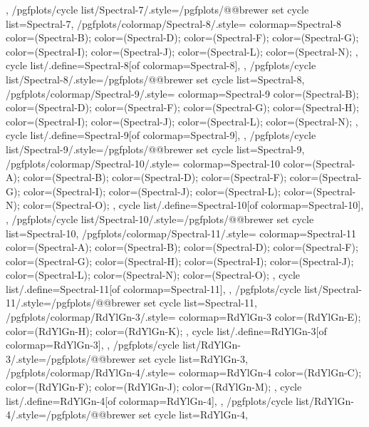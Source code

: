 {{  },
  /pgfplots/cycle list/Spectral-7/.style={/pgfplots/@@brewer set cycle list={Spectral-7}},
  /pgfplots/colormap/Spectral-8/.style={
    colormap={Spectral-8}{
      color=(Spectral-B);
      color=(Spectral-D);
      color=(Spectral-F);
      color=(Spectral-G);
      color=(Spectral-I);
      color=(Spectral-J);
      color=(Spectral-L);
      color=(Spectral-N);
    },
    cycle list/.define={Spectral-8}{[of colormap=Spectral-8]},
  },
  /pgfplots/cycle list/Spectral-8/.style={/pgfplots/@@brewer set cycle list={Spectral-8}},
  /pgfplots/colormap/Spectral-9/.style={
    colormap={Spectral-9}{
      color=(Spectral-B);
      color=(Spectral-D);
      color=(Spectral-F);
      color=(Spectral-G);
      color=(Spectral-H);
      color=(Spectral-I);
      color=(Spectral-J);
      color=(Spectral-L);
      color=(Spectral-N);
    },
    cycle list/.define={Spectral-9}{[of colormap=Spectral-9]},
  },
  /pgfplots/cycle list/Spectral-9/.style={/pgfplots/@@brewer set cycle list={Spectral-9}},
  /pgfplots/colormap/Spectral-10/.style={
    colormap={Spectral-10}{
      color=(Spectral-A);
      color=(Spectral-B);
      color=(Spectral-D);
      color=(Spectral-F);
      color=(Spectral-G);
      color=(Spectral-I);
      color=(Spectral-J);
      color=(Spectral-L);
      color=(Spectral-N);
      color=(Spectral-O);
    },
    cycle list/.define={Spectral-10}{[of colormap=Spectral-10]},
  },
  /pgfplots/cycle list/Spectral-10/.style={/pgfplots/@@brewer set cycle list={Spectral-10}},
  /pgfplots/colormap/Spectral-11/.style={
    colormap={Spectral-11}{
      color=(Spectral-A);
      color=(Spectral-B);
      color=(Spectral-D);
      color=(Spectral-F);
      color=(Spectral-G);
      color=(Spectral-H);
      color=(Spectral-I);
      color=(Spectral-J);
      color=(Spectral-L);
      color=(Spectral-N);
      color=(Spectral-O);
    },
    cycle list/.define={Spectral-11}{[of colormap=Spectral-11]},
  },
  /pgfplots/cycle list/Spectral-11/.style={/pgfplots/@@brewer set cycle list={Spectral-11}},
  /pgfplots/colormap/RdYlGn-3/.style={
    colormap={RdYlGn-3}{
      color=(RdYlGn-E);
      color=(RdYlGn-H);
      color=(RdYlGn-K);
    },
    cycle list/.define={RdYlGn-3}{[of colormap=RdYlGn-3]},
  },
  /pgfplots/cycle list/RdYlGn-3/.style={/pgfplots/@@brewer set cycle list={RdYlGn-3}},
  /pgfplots/colormap/RdYlGn-4/.style={
    colormap={RdYlGn-4}{
      color=(RdYlGn-C);
      color=(RdYlGn-F);
      color=(RdYlGn-J);
      color=(RdYlGn-M);
    },
    cycle list/.define={RdYlGn-4}{[of colormap=RdYlGn-4]},
  },
  /pgfplots/cycle list/RdYlGn-4/.style={/pgfplots/@@brewer set cycle list={RdYlGn-4}},
}

